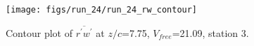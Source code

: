 \begin{figure}[H]
\centering
\texttt{[image: figs/run\_24/run\_24\_rw\_contour]}
\caption{Contour plot of $\overline{r^\prime w^\prime}$ at $z/c$=7.75, $V_{free}$=21.09, station 3.}
\label{fig:run_24_rw_contour}
\end{figure}


